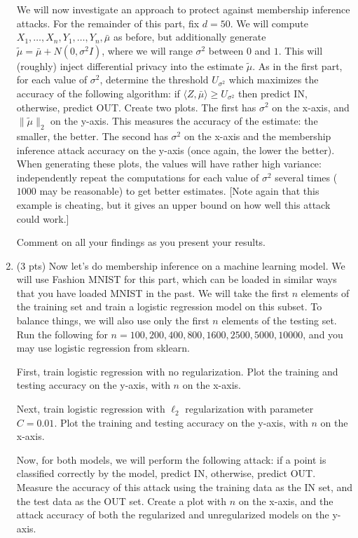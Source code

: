 \documentclass[10pt,letter,notitlepage]{article}
\newcounter{exercise}
\begin{document}
\begin{exercise}
\begin{enumerate}[label=\alph*)]
      We will now investigate an approach to protect against membership inference attacks.
      For the remainder of this part, fix $d = 50$.
      We will compute $X_1, \dots, X_n, Y_1, \dots, Y_n, \bar \mu$ as before, but additionally generate $\tilde \mu = \bar \mu + N(0, \sigma^2 I)$, where we will range $\sigma^2$ between $0$ and $1$.
      This will (roughly) inject differential privacy into the estimate $\tilde \mu$. 
      As in the first part, for each value of $\sigma^2$, determine the threshold $U_{\sigma^2}$ which maximizes the accuracy of the following algorithm: if $\langle Z, \bar \mu \rangle \geq U_{\sigma^2}$ then predict IN, otherwise, predict OUT.
      Create two plots. 
      The first has $\sigma^2$ on the x-axis, and $\|\tilde \mu\|_2$ on the y-axis. 
      This measures the accuracy of the estimate: the smaller, the better.
      The second has $\sigma^2$ on the x-axis and the membership inference attack accuracy on the y-axis (once again, the lower the better).
      When generating these plots, the values will have rather high variance: independently repeat the computations for each value of $\sigma^2$ several times ($1000$ may be reasonable) to get better estimates.
      [Note again that this example is cheating, but it gives an upper bound on how well this attack could work.]

      Comment on all your findings as you present your results.


    \item (3 pts)
      Now let's do membership inference on a machine learning model. 
      We will use Fashion MNIST for this part, which can be loaded in similar ways that you have loaded MNIST in the past.
      We will take the first $n$ elements of the training set and train a logistic regression model on this subset.
      To balance things, we will also use only the first $n$ elements of the testing set.
      Run the following for $n = 100, 200, 400, 800, 1600, 2500, 5000, 10000$, and you may use logistic regression from sklearn.

      First, train logistic regression with no regularization. 
      Plot the training and testing accuracy on the y-axis, with $n$ on the x-axis. 

      Next, train logistic regression with $\ell_2$ regularization with parameter $C = 0.01$.
      Plot the training and testing accuracy on the y-axis, with $n$ on the x-axis. 

      Now, for both models, we will perform the following attack: if a point is classified correctly by the model, predict IN, otherwise, predict OUT.
      Measure the accuracy of this attack using the training data as the IN set, and the test data as the OUT set.
      Create a plot with $n$ on the x-axis, and the attack accuracy of both the regularized and unregularized models on the y-axis.


\end{enumerate}
\end{exercise}
\end{document}
